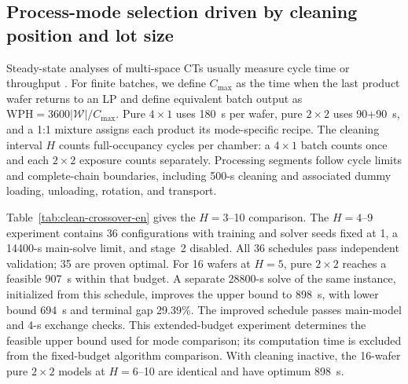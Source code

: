 \documentclass[journal]{IEEEtran}
\newcounter{algorithm}
\begin{document}
\subsection{Process-mode selection driven by cleaning position and lot size}

Steady-state analyses of multi-space CTs usually measure cycle time or throughput \cite{gu2024multifinger}. For finite batches, we define $C_{\max}$ as the time when the last product wafer returns to an LP and define equivalent batch output as $\mathrm{WPH}=3600|\mathcal W|/C_{\max}$. Pure $4\times1$ uses 180~s per wafer, pure $2\times2$ uses 90+90~s, and a 1:1 mixture assigns each product its mode-specific recipe. The cleaning interval $H$ counts full-occupancy cycles per chamber: a $4\times1$ batch counts once and each $2\times2$ exposure counts separately. Processing segments follow cycle limits and complete-chain boundaries, including 500-s cleaning and associated dummy loading, unloading, rotation, and transport.

Table~\ref{tab:clean-crossover-en} gives the $H=3$--10 comparison. The $H=4$--9 experiment contains 36 configurations with training and solver seeds fixed at 1, a 14400-s main-solve limit, and stage~2 disabled. All 36 schedules pass independent validation; 35 are proven optimal. For 16 wafers at $H=5$, pure $2\times2$ reaches a feasible 907~s within that budget. A separate 28800-s solve of the same instance, initialized from this schedule, improves the upper bound to 898~s, with lower bound 694~s and terminal gap 29.39\%. The improved schedule passes main-model and 4-s exchange checks. This extended-budget experiment determines the feasible upper bound used for mode comparison; its computation time is excluded from the fixed-budget algorithm comparison. With cleaning inactive, the 16-wafer pure $2\times2$ models at $H=6$--10 are identical and have optimum 898~s.
\end{document}
